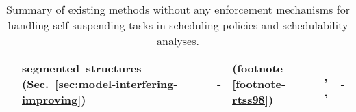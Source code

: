 \begin{table}[h]
{\begin{tabular}{||C{0.5cm}|C{3.3cm}||C{3cm}|C{3cm}|C{3cm}|C{5cm}|}
& segmented~structures (Sec.~\ref{sec:model-interfering-improving}) &
- & \cite{PH:rtss98} (footnote \ref{footnote-rtss98}) & \cite{RTCSA-BletsasA05}, \cite[Chapter 5.4]{bletsas:thesis}, \cite{Huang:multiseg} & -\\
\hline
\end{tabular}
}
  \caption{Summary of existing methods without any enforcement
    mechanisms for handling self-suspending tasks in scheduling
    policies and schedulability analyses. } 
  \label{tab:summary-methods}
\end{table}


